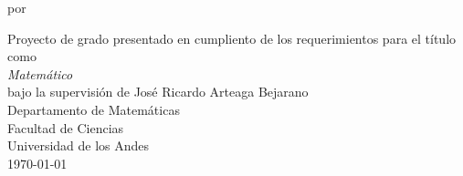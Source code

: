 \begin{titlepage}
\begin{center}

\Huge
\makeatletter
\textbf{\@title}

\Large

\vspace{3.cm}

por \textbf{\@author{}}

\vfill
\large
Proyecto de grado presentado en cumpliento de los requerimientos para el título como\\
\textit{Matemático}\\
bajo la supervisión de José Ricardo Arteaga Bejarano\\
\vfill
\large
Departamento de Matemáticas\\
Facultad de Ciencias\\
Universidad de los Andes\\

\today
\makeatother

\end{center}
\end{titlepage}
